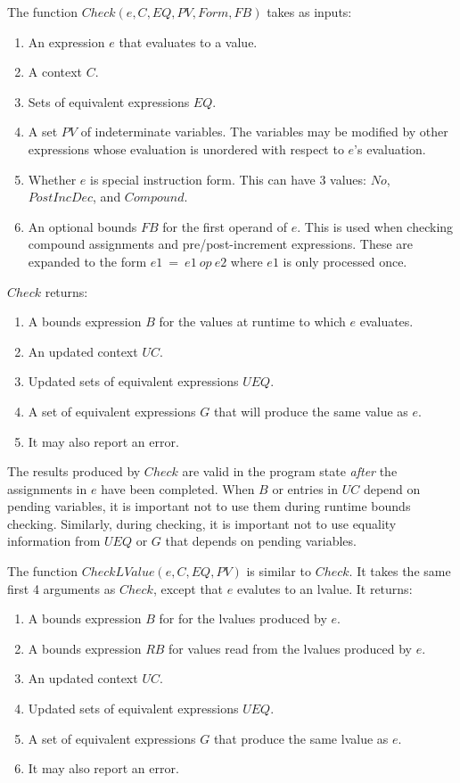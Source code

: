 The function $Check(e, C, EQ, PV, Form, FB)$ takes as inputs:
\begin{enumerate}
\item An expression $e$ that evaluates to a value.
\item A context $C$.
\item Sets of equivalent expressions $EQ$.
\item A set $PV$ of indeterminate variables.  The variables 
may be modified by other expressions whose  evaluation is unordered with respect to $e$'s evaluation.
\item Whether $e$ is special instruction form.  This can have 3 values: $No$, $PostIncDec$,
and $Compound$.
\item An optional bounds $FB$ for the first operand of $e$.  
This is used when checking compound assignments and pre/post-increment expressions.  These are
expanded to the form $e1~=~e1~op~e2$ where $e1$ is only processed once. 
\end{enumerate}

$Check$ returns:
\begin{enumerate}
\item A bounds expression $B$ for the values at runtime to which $e$ evaluates.
\item An updated context $\mathit{UC}$.
\item Updated sets of equivalent expressions $UEQ$.
\item A set of equivalent expressions $G$ that will produce the same value as $e$. 
\item It may also report an error.
\end{enumerate}
The results produced by $Check$ are valid in the program state
{\em after} the assignments in $e$ have been completed.   When $B$ or entries in 
$\mathit{UC}$ depend on pending variables, it is important not to use them during runtime bounds checking.
Similarly, during checking, it is important not to use equality information
from $UEQ$ or $G$ that depends on pending variables.

The function $CheckLValue(e, C, EQ, PV)$ is similar to $Check$.  It takes the
same first 4 arguments as $Check$, except that $e$ evalutes to an lvalue.
It returns:
\begin{enumerate}
\item A bounds expression $B$ for for the lvalues produced by $e$.
\item A bounds expression $RB$ for values read from the lvalues produced by $e$.
\item An updated context $\mathit{UC}$.
\item Updated sets of equivalent expressions $UEQ$.
\item A set of equivalent expressions $G$ that produce the same lvalue as $e$.
\item It may also report an error.
\end{enumerate}

